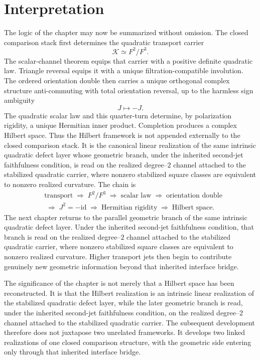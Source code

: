 \section{Interpretation}
\label{sec:hilbert-interpretation}
The logic of the chapter may now be summarized without omission.
The closed comparison stack first determines the quadratic transport carrier
\[
	\mathcal K \simeq F^{2}/F^{3}.
\]
The scalar-channel theorem equips that carrier with a positive definite
quadratic law.
Triangle reversal equips it with a unique filtration-compatible
involution.
The ordered orientation double then carries a unique orthogonal complex
structure anti-commuting with total orientation reversal, up to the
harmless sign ambiguity
\[
	J\mapsto -J.
\]
The quadratic scalar law and this quarter-turn determine, by
polarization rigidity, a unique Hermitian inner product.
Completion produces a complex Hilbert space.
Thus the Hilbert framework is not appended externally to the closed
comparison stack.
It is the canonical linear realization of the same intrinsic quadratic
defect layer whose geometric branch, under the inherited
second-jet faithfulness condition, is read on the realized
degree--\(2\) channel attached to the stabilized quadratic carrier,
where nonzero stabilized square classes are equivalent to nonzero
realized curvature.
The chain is
\[
	\begin{aligned}
		 & \text{transport}
		\;\Longrightarrow\;
		F^{2}/F^{3}
		\;\Longrightarrow\;
		\text{scalar law}
		\;\Longrightarrow\;
		\text{orientation double}
		\\
		 & \;\Longrightarrow\;
		J^{2}=-\mathrm{id}
		\;\Longrightarrow\;
		\text{Hermitian rigidity}
		\;\Longrightarrow\;
		\text{Hilbert space}.
	\end{aligned}
\]
The next chapter returns to the parallel geometric branch of the same
intrinsic quadratic defect layer.
Under the inherited second-jet faithfulness condition, that branch is
read on the realized degree--\(2\) channel attached to the stabilized
quadratic carrier, where nonzero stabilized square classes are
equivalent to nonzero realized curvature.
Higher transport jets then begin to contribute genuinely new
geometric information beyond that inherited interface bridge.
\begin{remark}
	The significance of the chapter is not merely that a Hilbert space has
	been reconstructed.
	It is that the Hilbert realization is an intrinsic linear realization
	of the stabilized quadratic defect layer, while the later geometric
	branch is read, under the inherited second-jet faithfulness condition,
	on the realized degree--\(2\) channel attached to the stabilized
	quadratic carrier.
	The subsequent development therefore does not juxtapose two unrelated
	frameworks.
	It develops two linked realizations of one closed comparison
	structure, with the geometric side entering only through that
	inherited interface bridge.
\end{remark}


